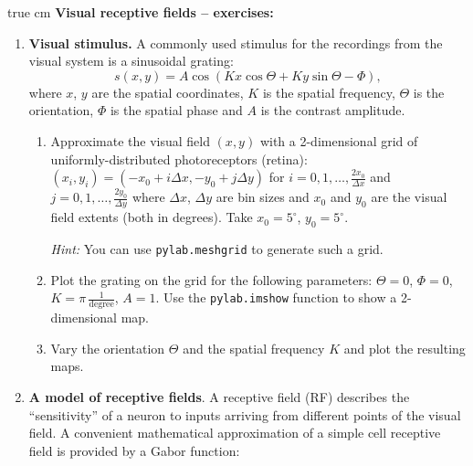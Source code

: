 \documentclass[12pt, a4]{article}
\begin{document}
 true cm
{\bf Visual receptive fields -- exercises:}
\begin{enumerate}

    \item \textbf{Visual stimulus.} A commonly used stimulus for the recordings from the visual
        system is a sinusoidal grating:
        \begin{equation}
            s(x, y) = A \cos(Kx\cos\Theta + Ky\sin\Theta
            -\Phi),
            \label{eq:grating}
        \end{equation}
        where $x$, $y$ are the spatial coordinates, $K$ is the spatial
        frequency, $\Theta$ is the orientation,  $\Phi$ is the spatial
        phase and $A$ is the contrast amplitude.

        \begin{enumerate}
            \item Approximate the visual field $(x,y)$ with a
                2-dimensional grid of uniformly-distributed
                photoreceptors (retina):
                $(x_i, y_i)= (-x_0+i\Delta x, -y_0+j\Delta y)$ for
                $i=0,1,\dots, \frac{2x_0}{\Delta x}$ and $j=0,1,\dots,
                \frac{2y_0}{\Delta y}$ where $\Delta x$, $\Delta y$
                are bin sizes and $x_0$ and $y_0$ are the
                visual field extents (both in degrees). Take
                $x_0=5^\circ$, $y_0=5^\circ$.
                
                \textit{Hint:} You can use
                \texttt{pylab.meshgrid} to generate such a grid. 
            \item \label{ex:grating} Plot the grating on the
                grid for the following parameters: $\Theta=0$,
                $\Phi=0$, $K=\pi\,\frac{1}{\mathrm{degree}}$, $A=1$.  Use the 
                \texttt{pylab.imshow} function to show a 2-dimensional map. 
            \item \label{ex:varygrating}Vary the orientation $\Theta$ and the
                spatial frequency $K$ and plot the resulting maps.
        \end{enumerate}

    \item \textbf{A model of receptive fields}.  A receptive field (RF)
                describes the ``sensitivity'' of a neuron to inputs arriving from
                different points of the visual field. A convenient mathematical
                approximation of a simple cell receptive field is provided by a
                Gabor function:


\end{enumerate}
\end{document}
